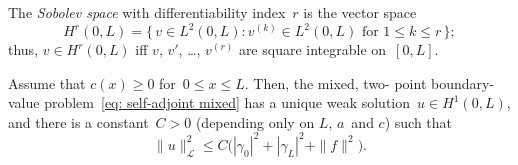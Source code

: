 The \emph{Sobolev space} with differentiability index~$r$ is the vector
space
\begin{equation}\label{eq: Hr 1d def}
H^r(0,L)=\{\,v\in L^2(0,L): \text{$v^{(k)}\in L^2(0,L)$ for $1\le k\le r$}\,\};
\end{equation}
thus, $v\in H^r(0,L)$ iff $v$, $v'$, \dots, $v^{(r)}$ are square integrable
on~$[0,L]$.

\begin{theorem}\label{thm: ||u||A}
Assume that $c(x)\ge0$ for~$0\le x\le L$.  Then, the mixed, two-
point boundary-value problem~\eqref{eq: self-adjoint mixed} has a unique weak
solution~$u\in H^1(0,L)$, and there is a constant~$C>0$ (depending only on $L$,
$a$~and $c$) such that
\[
\|u\|_{\mathcal{L}}^2\le C\bigl(|\gamma_0|^2+|\gamma_L|^2+\|f\|^2\bigr).
\]
\end{theorem}
